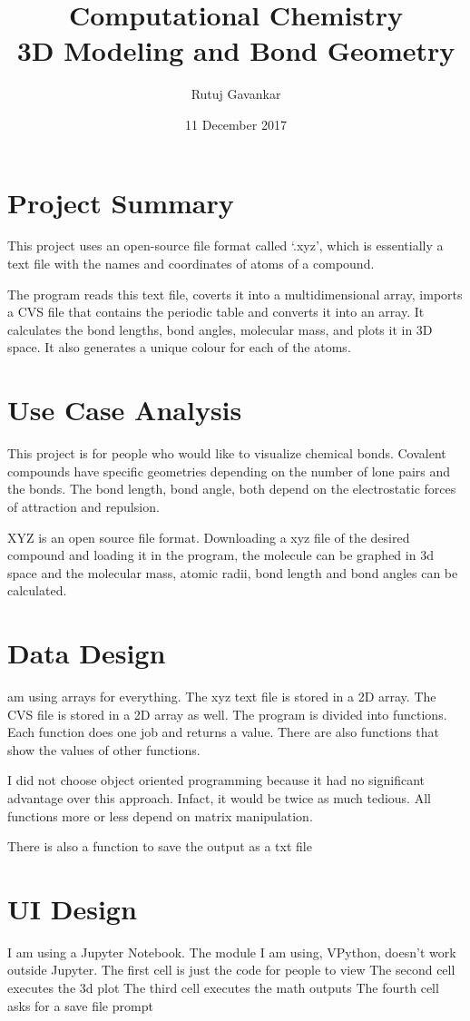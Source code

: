 \documentclass{article}[12pt]
\title{Computational Chemistry \\ \small 3D Modeling and Bond Geometry}
\author{Rutuj Gavankar}
\date{11 December 2017}
\begin{document}
	\maketitle
	\section{Project Summary}
	This project uses an open-source file format called `.xyz', which is essentially a text file with the names and coordinates of atoms of a compound. 
	
	The program reads this text file, coverts it into a multidimensional array, imports a CVS file that contains the periodic table and converts it into an array. It calculates the bond lengths, bond angles, molecular mass, and plots it in 3D space. It also generates a unique colour for each of the atoms.
	
	\section{Use Case Analysis}	
	This project is for people who would like to visualize chemical bonds. Covalent compounds have specific geometries depending on the number of lone pairs and the bonds. The bond length, bond angle, both depend on the electrostatic forces of attraction and repulsion. 
	
	XYZ is an open source file format. Downloading a xyz file of the desired compound and loading it in the program, the molecule can be graphed in 3d space and the molecular mass, atomic radii, bond length and bond angles can be calculated.
	
	\section{Data Design}
	am using arrays for everything. The xyz text file is stored in a 2D array. The CVS file is stored in a 2D array as well. The program is divided into functions. Each function does one job and returns a value. There are also functions that show the values of other functions.
	
	I did not choose object oriented programming because it had no significant advantage over this approach. Infact, it would be twice as much tedious. All functions more or less depend on matrix manipulation. 
	
	There is also a function to save the output as a txt file
	
	\section{UI Design}
	I am using a Jupyter Notebook. The module I am using, VPython, doesn’t work outside Jupyter. 
	The first cell is just the code for people to view
	The second cell executes the 3d plot
	The third cell executes the math outputs
	The fourth cell asks for a save file prompt
	
\end{document}
